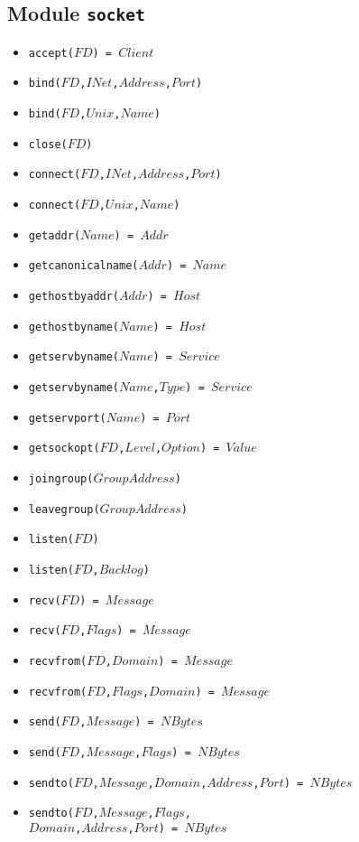\documentclass[10pt]{article}
\begin{document}
\begin{multicols}{2}
{\section*{Module \texttt{socket}}
\begin{scriptsize}
\begin{itemize}
    \item \texttt{accept($FD$) = $Client$}
    \item \texttt{bind($FD$,$INet$,$Address$,$Port$)}
    \item \texttt{bind($FD$,$Unix$,$Name$)}
    \item \texttt{close($FD$)}
    \item \texttt{connect($FD$,$INet$,$Address$,$Port$)}
    \item \texttt{connect($FD$,$Unix$,$Name$)}
    \item \texttt{getaddr($Name$) = $Addr$}
    \item \texttt{getcanonicalname($Addr$) = $Name$}
    \item \texttt{gethostbyaddr($Addr$) = $Host$}
    \item \texttt{gethostbyname($Name$) = $Host$}
    \item \texttt{getservbyname($Name$) = $Service$}
    \item \texttt{getservbyname($Name$,$Type$) = $Service$}
    \item \texttt{getservport($Name$) = $Port$}
    \item \texttt{getsockopt($FD$,$Level$,$Option$) = $Value$}
    \item \texttt{joingroup($GroupAddress$)}
    \item \texttt{leavegroup($GroupAddress$)}
    \item \texttt{listen($FD$)}
    \item \texttt{listen($FD$,$Backlog$)}
    \item \texttt{recv($FD$) = $Message$}
    \item \texttt{recv($FD$,$Flags$) = $Message$}
    \item \texttt{recvfrom($FD$,$Domain$) = $Message$}
    \item \texttt{recvfrom($FD$,$Flags$,$Domain$) = $Message$}
    \item \texttt{send($FD$,$Message$) = $NBytes$}
    \item \texttt{send($FD$,$Message$,$Flags$) = $NBytes$}
    \item \texttt{sendto($FD$,$Message$,$Domain$,$Address$,$Port$) = $NBytes$}
    \item \texttt{sendto($FD$,$Message$,$Flags$,\\        $Domain$,$Address$,$Port$) = $NBytes$}

\end{itemize}
\end{scriptsize}}
\end{multicols}
\end{document}
